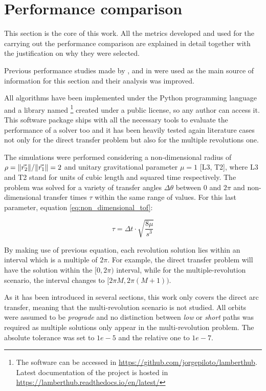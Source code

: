 \section{Performance comparison}
\label{sec:performance}

This section is the core of this work. All the metrics developed and used for
the carrying out the performance comparison are explained in detail together
with the justification on why they were selected.

Previous performance studies made by \cite{klumpp1999}, \cite{torre2015} and in
\cite{martinez2021} were used as the main source of information for this section
and their analysis was improved.

All algorithms have been implemented under the Python programming language and a
library named \footnote{The software can be accessed in
\href{https://github.com/jorgepiloto/lamberthub}{https://github.com/jorgepiloto/lamberthub}.
Latest documentation of the project is hosted in
\href{https://lamberthub.readthedocs.io/en/latest/}{https://lamberthub.readthedocs.io/en/latest/}}
created under a public license, so any author can access it. This software
package ships with all the necessary tools to evaluate the performance of a
solver too and it has been heavily tested again literature cases not only for
the direct transfer problem but also for the multiple revolutions one.

The simulations were performed considering a non-dimensional radius of
$\rho=\lVert\vec{r_2}\rVert/\lVert\vec{r_1}\rVert=2$ and unitary gravitational parameter
$\mu=1$ [L3, T2], where L3 and T2 stand for units of cubic length and squared
time respectively. The problem was solved for a variety of transfer angles
$\Delta \theta$ between $0$ and $2\pi$ and non-dimensional transfer times $\tau$
within the same range of values. For this last parameter, equation
\ref{eq:non_dimensional_tof}:

\begin{equation}
  \tau =  \Delta t \cdot \sqrt{\frac{8\mu}{s^3}}
  \label{eq:non_dimensional_tof}
\end{equation}

By making use of previous equation, each revolution solution lies within an
interval which is a multiple of $2\pi$. For example, the direct transfer problem
will have the solution within the $[0, 2\pi)$ interval, while for the
multiple-revolution scenario, the interval changes to $[2\pi M, 2\pi(M+1))$.

As it has been introduced in several sections, this work only covers the direct
arc transfer, meaning that the multi-revolution scenario is not studied. All
orbits were assumed to be \textit{prograde} and no distinction between
\textit{low} or \textit{short} paths was required as multiple solutions only
appear in the multi-revolution problem. The absolute tolerance was set to $1e-5$
and the relative one to $1e-7$.

